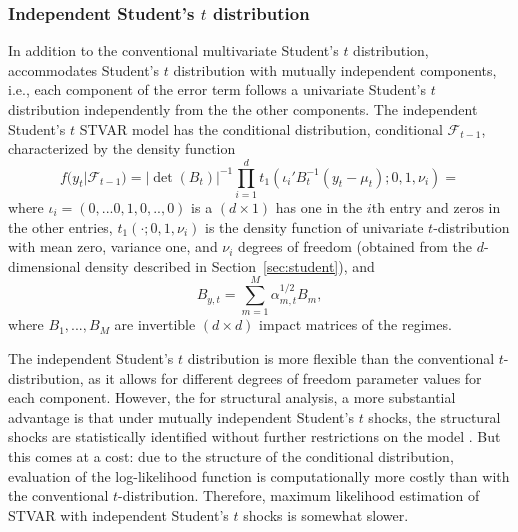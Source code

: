 \documentclass[nojss]{jss}
\begin{document}
\subsubsection{Independent Student's $t$ distribution}\label{sec:indstudent}
In addition to the conventional multivariate Student's $t$ distribution,  accommodates Student's $t$ distribution with mutually independent components, i.e., each component of the error term follows a univariate Student's $t$ distribution independently from the the other components. The independent Student's $t$ STVAR model has the conditional distribution, conditional $\mathcal{F}_{t-1}$, characterized by the density function
\begin{equation}
f(y_t|\mathcal{F}_{t-1}) = |\det(B_t)|^{-1}\prod_{i=1}^d t_1(\iota_i'B_t^{-1}(y_t - \mu_t);0,1,\nu_i) =
\end{equation}
where $\iota_i=(0,...0,1,0,..,0)$ is a $(d\times 1)$ has one in the $i$th entry and zeros in the other entries, $t_1(\cdot;0,1,\nu_i)$ is the density function of univariate $t$-distribution with mean zero, variance one, and $\nu_i$ degrees of freedom (obtained from the $d$-dimensional density described in Section~\ref{sec:student}), and
\begin{equation}\label{eq:Bt}
B_{y,t} = \sum_{m=1}^M \alpha_{m,t}^{1/2}B_m,
\end{equation}
where $B_1,...,B_M$ are invertible $(d\times d)$ impact matrices of the regimes.

The independent Student's $t$ distribution is more flexible than the conventional $t$-distribution, as it allows for different degrees of freedom parameter values for each component. However, the for structural analysis, a more substantial advantage is that under mutually independent Student's $t$ shocks, the structural shocks are statistically identified without further restrictions on the model \citep{Virolainen2:2024}. But this comes at a cost: due to the structure of the conditional distribution, evaluation of the log-likelihood function is computationally more costly than with the conventional $t$-distribution. Therefore, maximum likelihood estimation of STVAR with independent Student's $t$ shocks is somewhat slower.
\end{document}
